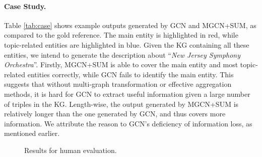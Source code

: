 \documentclass[11pt,a4paper]{article}
\begin{document}
\paragraph{Case Study.}
Table \ref{tab:case} shows example outputs generated by GCN and MGCN+SUM, as compared to the gold reference.
The main entity is highlighted in red, while topic-related entities are highlighted in blue.
Given the KG containing all these entities, we intend to generate the description about ``\textit{New Jersey Symphony Orchestra}''.
Firstly, MGCN+SUM is able to cover the main entity and most topic-related entities correctly, while GCN fails to identify the main entity.
This suggests that without multi-graph transformation or effective aggregation methods, it is hard for GCN to extract useful information given a large number of triples in the KG.
Length-wise, the output generated by MGCN+SUM is relatively longer than the one generated by GCN, and thus covers more information. 
We attribute the reason to GCN's deficiency of information loss, as mentioned earlier.





\begin{figure}[t!]
\centering
{}
\caption{\label{fig:human} Results for human evaluation.}
\end{figure}
\end{document}
